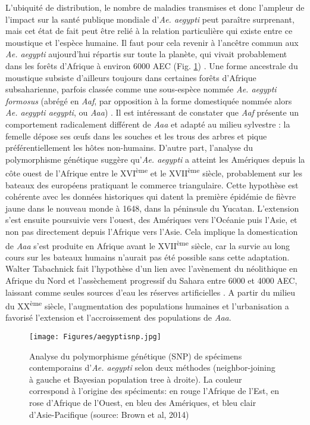 L'ubiquité de distribution, le nombre de maladies transmises et donc l'ampleur de l'impact sur la santé publique mondiale d'{\em Ae. aegypti} peut paraître surprenant, mais cet état de fait peut être relié à la relation particulière qui existe entre ce moustique et l'espèce humaine.
Il faut pour cela revenir à l'ancêtre commun aux {\em Ae. aegypti} aujourd'hui répartis sur toute la planète, qui vivait probablement dans les forêts d'Afrique à environ 6000 AEC (Fig. \ref{fig:aegyptisnp}) \cite{brown2014human}.
Une forme ancestrale du moustique subsiste d'ailleurs toujours dans certaines forêts d'Afrique subsaharienne, parfois classée comme une sous-espèce nommée {\em Ae. aegypti formosus} (abrégé en {\em Aaf}, par opposition à la forme domestiquée nommée alors {\em Ae. aegypti aegypti}, ou {\em Aaa}) \cite{powell2013history}.
Il est intéressant de constater que {\em Aaf} présente un comportement radicalement différent de {\em Aaa} et adapté au milieu sylvestre : la femelle dépose ses \oe ufs dans les souches et les trous des arbres et pique préférentiellement les hôtes non-humains.
D'autre part, l'analyse du polymorphisme génétique suggère qu'{\em Ae. aegypti} a atteint les Amériques depuis la côte ouest de l'Afrique entre le XVI\textsuperscript{ème} et le XVII\textsuperscript{ème} siècle, probablement sur les bateaux des européens pratiquant le commerce triangulaire.
Cette hypothèse est cohérente avec les données historiques qui datent la première épidémie de fièvre jaune dans le nouveau monde à 1648, dans la péninsule du Yucatan.
L'extension s'est ensuite poursuivie vers l'ouest, des Amériques vers l'Océanie puis l'Asie, et non pas directement depuis l'Afrique vers l'Asie.
Cela implique la domestication de {\em Aaa} s'est produite en Afrique avant le XVII\textsuperscript{ème} siècle, car la survie au long cours sur les bateaux humains n'aurait pas été possible sans cette adaptation.
Walter Tabachnick fait l'hypothèse d'un lien avec l'avènement du néolithique en Afrique du Nord et l'assèchement progressif du Sahara entre 6000 et 4000 AEC, laissant comme seules sources d'eau les réserves artificielles \cite{tabachnick1991evolutionary}.
A partir du milieu du XX\textsuperscript{ème} siècle, l'augmentation des populations humaines et l'urbanisation a favorisé l'extension et l'accroissement des populations de {\em Aaa}.

\begin{figure}[t]
	\centering
	\texttt{[image: Figures/aegyptisnp.jpg]}
	\caption{Analyse du polymorphisme génétique (SNP) de spécimens contemporains d'{\em Ae. aegypti} selon deux méthodes (\guillemotleft neighbor-joining\guillemotright \;  à gauche et \guillemotleft Bayesian population tree\guillemotright \; à droite). La couleur correspond à l'origine des spéciments: en rouge l'Afrique de l'Est, en rose d'Afrique de l'Ouest, en bleu des Amériques, et bleu clair d'Asie-Pacifique (source: Brown et al, 2014)}
	\label{fig:aegyptisnp}
\end{figure}


